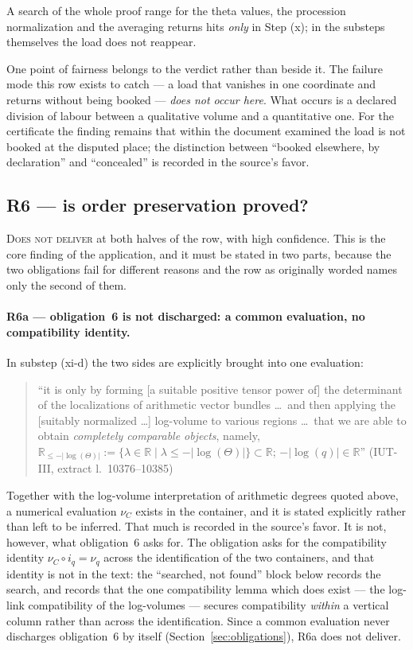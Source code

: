 \documentclass[11pt,a4paper]{article}
\theoremstyle{definition}
\newcommand{\anchor}[2]{(#1, extract l.~#2)}
\begin{document}
A search of the whole proof range for the theta values, the procession
normalization and the averaging returns hits \emph{only} in Step (x); in the
substeps themselves the load does not reappear.

One point of fairness belongs to the verdict rather than beside it. The failure
mode this row exists to catch --- a load that vanishes in one coordinate and
returns without being booked --- \emph{does not occur here}. What occurs is a
declared division of labour between a qualitative volume and a quantitative one.
For the certificate the finding remains that within the document examined the
load is not booked at the disputed place; the distinction between ``booked
elsewhere, by declaration'' and ``concealed'' is recorded in the source's favor.

\subsection{R6 --- is order preservation proved?}

\textsc{Does not deliver} at both halves of the row, with high confidence. This
is the core finding of the application, and it must be stated in two parts,
because the two obligations fail for different reasons and the row as originally
worded names only the second of them.

\paragraph{R6a --- obligation~6 is not discharged: a common evaluation, no
compatibility identity.} In substep (xi-d) the two sides are
explicitly brought into one evaluation:

\begin{quote}\small
``it is only by forming [a suitable positive tensor power of] the determinant of
the localizations of arithmetic vector bundles \dots\ and then applying the
[suitably normalized \dots] log-volume to various regions \dots\ that we are able
to obtain \emph{completely comparable objects}, namely,
$\mathbb{R}_{\le -|\log(\Theta)|} := \{\lambda \in \mathbb{R} \mid \lambda \le
-|\log(\Theta)|\} \subset \mathbb{R}$; $-|\log(q)| \in \mathbb{R}$''
\hfill\anchor{IUT-III}{10376--10385}
\end{quote}

Together with the log-volume interpretation of arithmetic degrees quoted above,
a numerical evaluation $\nu_C$ exists in the container, and it is stated
explicitly rather than left to be inferred. That much is recorded in the
source's favor. It is not, however, what obligation~6 asks for. The obligation
asks for the compatibility identity $\nu_C \circ i_q = \nu_q$ across the
identification of the two containers, and that identity is not in the text: the
``searched, not found'' block below records the search, and records that the one
compatibility lemma which does exist --- the log-link compatibility of the
log-volumes --- secures compatibility \emph{within} a vertical column rather than
across the identification. Since a common evaluation never discharges
obligation~6 by itself (Section~\ref{sec:obligations}), R6a does not deliver.
\end{document}
